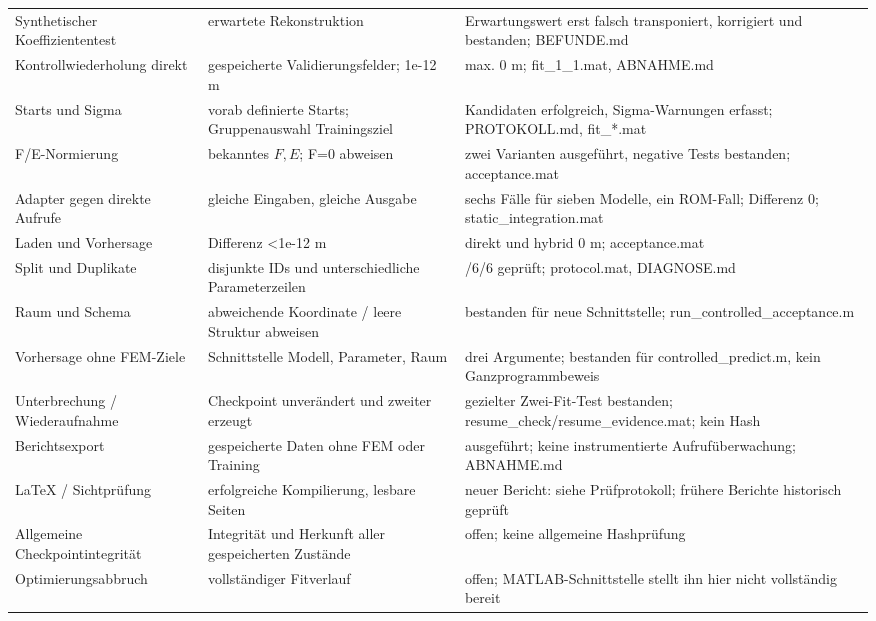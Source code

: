 \documentclass[11pt,a4paper]{article}
\begin{document}
\begin{longtable}{>{\raggedright\arraybackslash}p{}>{\raggedright\arraybackslash}p{}>{\raggedright\arraybackslash}p{}}
Synthetischer Koeffiziententest & erwartete Rekonstruktion & Erwartungswert erst falsch transponiert, korrigiert und bestanden; BEFUNDE.md\\
Kontrollwiederholung direkt & gespeicherte Validierungsfelder; 1e-12 m & max. 0 m; fit\_\allowbreak{}1\_\allowbreak{}1.mat, ABNAHME.md\\
Starts und Sigma & vorab definierte Starts; Gruppenauswahl Trainingsziel & 16 Kandidaten erfolgreich, Sigma-Warnungen erfasst; PROTOKOLL.md, fit\_\allowbreak{}*.mat\\
F/E-Normierung & bekanntes $F,E$; F=0 abweisen & zwei Varianten ausgeführt, negative Tests bestanden; acceptance.mat\\
Adapter gegen direkte Aufrufe & gleiche Eingaben, gleiche Ausgabe & sechs Fälle für sieben Modelle, ein ROM-Fall; Differenz 0; static\_\allowbreak{}integration.mat\\
Laden und Vorhersage & Differenz <1e-12 m & direkt und hybrid 0 m; acceptance.mat\\
Split und Duplikate & disjunkte IDs und unterschiedliche Parameterzeilen & 18/6/6 geprüft; protocol.mat, DIAGNOSE.md\\
Raum und Schema & abweichende Koordinate / leere Struktur abweisen & bestanden für neue Schnittstelle; run\_\allowbreak{}controlled\_\allowbreak{}acceptance.m\\
Vorhersage ohne FEM-Ziele & Schnittstelle Modell, Parameter, Raum & drei Argumente; bestanden für controlled\_\allowbreak{}predict.m, kein Ganzprogrammbeweis\\
Unterbrechung / Wiederaufnahme & Checkpoint unverändert und zweiter erzeugt & gezielter Zwei-Fit-Test bestanden; resume\_\allowbreak{}check/resume\_\allowbreak{}evidence.mat; kein Hash\\
Berichtsexport & gespeicherte Daten ohne FEM oder Training & ausgeführt; keine instrumentierte Aufrufüberwachung; ABNAHME.md\\
LaTeX / Sichtprüfung & erfolgreiche Kompilierung, lesbare Seiten & neuer Bericht: siehe Prüfprotokoll; frühere Berichte historisch geprüft\\
Allgemeine Checkpointintegrität & Integrität und Herkunft aller gespeicherten Zustände & offen; keine allgemeine Hashprüfung\\
Optimierungsabbruch & vollständiger Fitverlauf & offen; MATLAB-Schnittstelle stellt ihn hier nicht vollständig bereit\\
\bottomrule\end{longtable}\endgroup
\end{document}
